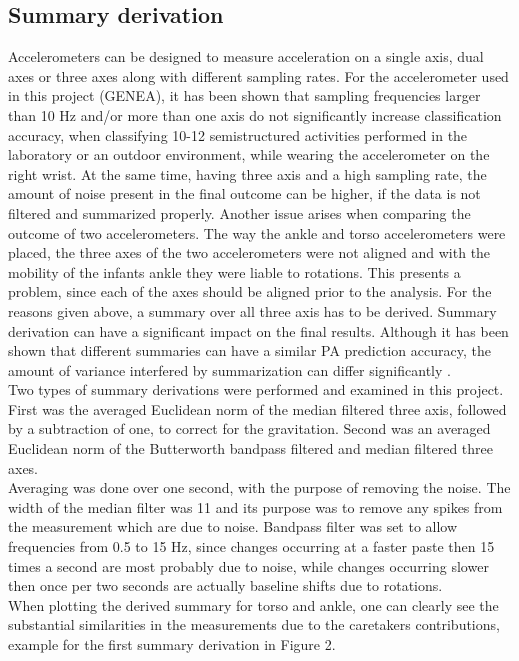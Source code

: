 \documentclass{article}
\begin{document}
{\subsection{Summary derivation}
Accelerometers can be designed to measure acceleration on a single axis, dual axes or three axes along with different sampling rates. For the accelerometer used in this project (GENEA), it has been shown that sampling frequencies larger than 10 Hz and/or more than one axis do not significantly increase classification accuracy, when classifying 10-12 semistructured activities performed in the laboratory or an outdoor environment, while wearing the accelerometer on the right wrist\cite{ref7}. At the same time, having three axis and a high sampling rate, the amount of noise present in the final outcome can be higher, if the data is not filtered and summarized properly. Another issue arises when comparing the outcome of two accelerometers. The way the ankle and torso accelerometers were placed, the three axes of the two accelerometers were not aligned and with the mobility of the infants ankle they were liable to rotations. This presents a problem, since each of the axes should be aligned prior to the analysis. For the reasons given above, a summary over all three axis has to be derived. Summary derivation can have a significant impact on the final results. Although it has been shown that different summaries can have a similar PA prediction accuracy, the amount of variance interfered by summarization can differ significantly \cite{ref3}.\\
Two types of summary derivations were performed and examined in this project. First was the averaged Euclidean norm of the median filtered three axis, followed by a subtraction of one, to correct for the gravitation. Second was an averaged Euclidean norm of the Butterworth bandpass filtered and median filtered three axes.\\
Averaging was done over one second, with the purpose of removing the noise. The width of the median filter was 11 and its purpose was to remove any spikes from the measurement which are due to noise. Bandpass filter was set to allow frequencies from 0.5 to 15 Hz, since changes occurring at a faster paste then 15 times a second are most probably due to noise, while changes occurring slower then once per two seconds are actually baseline shifts due to rotations.\\ When plotting the derived summary for torso and ankle, one can clearly see the substantial similarities in the measurements due to the caretakers contributions, example for the first summary derivation in Figure 2. 
}
\end{document}
